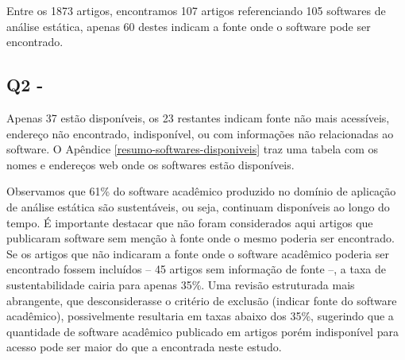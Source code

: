 Entre os 1873 artigos, encontramos 107 artigos referenciando 105 softwares de
análise estática, apenas 60 destes indicam a fonte onde o software pode ser
encontrado.


\subsection{Q2 - \EstudoUmQuestaoDois} %


Apenas 37 estão disponíveis, os 23 restantes indicam fonte não mais
acessíveis, endereço não encontrado, indisponível, ou com informações não
relacionadas ao software. 
O Apêndice \ref{resumo-softwares-disponiveis} traz
uma tabela com os nomes e endereços web onde os softwares estão disponíveis.

Observamos que 61\% do software acadêmico produzido no domínio de aplicação de análise estática 
são sustentáveis, ou seja, continuam disponíveis ao longo do tempo. 
É importante destacar que não foram considerados aqui artigos que publicaram software 
sem menção à fonte onde o mesmo poderia ser encontrado.
Se os artigos que não indicaram a fonte onde o software acadêmico poderia ser encontrado
fossem incluídos -- 45 artigos sem informação de fonte --, 
a taxa de sustentabilidade cairia para apenas 35\%.
Uma revisão estruturada mais abrangente, que desconsiderasse o critério de exclusão
(indicar fonte do software acadêmico), possivelmente resultaria em taxas abaixo dos 35\%, 
sugerindo que a quantidade de software acadêmico publicado em artigos porém indisponível para acesso
pode ser maior do que a encontrada neste estudo.


